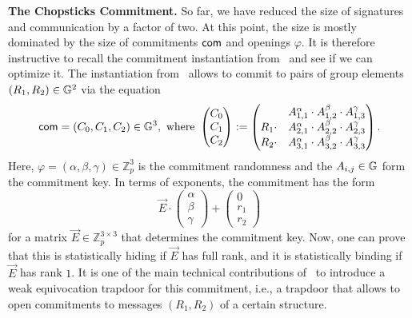 \documentclass[version=final]{iacrcc}
\theoremstyle{mytheorem}				\newtheorem{theorem}{Theorem}
\theoremstyle{myplain}
\theoremstyle{mydefinition}
\theoremstyle{myremark}
\newcommand{\ZZ}{\mathbb{Z}}
\begin{document}
\smallskip\noindent\textbf{The Chopsticks Commitment.}
So far, we have reduced the size of signatures and communication by a factor of two.
At this point, the size is mostly dominated by the size of commitments $\mathsf{com}$ and openings $\varphi$.
It is therefore instructive to recall the commitment instantiation from~\cite{EC:PanWag23} and see if we can optimize it. 
The instantiation from~\cite{EC:PanWag23} allows to commit to pairs of group elements $(R_1,R_2) \in {\ensuremath{\mathbb{G}}}^2$ via the equation \[
	\mathsf{com} = (C_0,C_1,C_2) \in {\ensuremath{\mathbb{G}}}^3, \text{ where } \begin{pmatrix}C_0 \\ C_1 \\ C_2\end{pmatrix} :=  \begin{pmatrix} &A_{1,1}^\alpha \cdot A_{1,2}^\beta \cdot A_{1,3}^\gamma \\ R_1\cdot&A_{2,1}^\alpha \cdot A_{2,2}^\beta \cdot A_{2,3}^\gamma \\ R_2\cdot&A_{3,1}^\alpha \cdot A_{3,2}^\beta \cdot A_{3,3}^\gamma\end{pmatrix}. \] 
Here, $\varphi = (\alpha,\beta,\gamma) \in \ZZ_p^3$ is the commitment randomness and the $A_{i,j} \in {\ensuremath{\mathbb{G}}}$ form the commitment key.
In terms of exponents, the commitment has the form
	\[
		\vec{E}\cdot \begin{pmatrix}\alpha\\ \beta \\ \gamma\end{pmatrix} + \begin{pmatrix}0 \\ r_1 \\ r_2\end{pmatrix}
	\] for a matrix $\vec{E} \in \ZZ_p^{3\times 3}$ that determines the commitment key.
Now, one can prove that this is statistically hiding if $\vec{E}$ has full rank, and it is statistically binding if $\vec{E}$ has rank $1$.
It is one of the main technical contributions of~\cite{EC:PanWag23} to introduce a weak equivocation trapdoor for this commitment, i.e., a trapdoor that allows to open commitments to messages $(R_1,R_2)$ of a certain structure.
\end{document}
